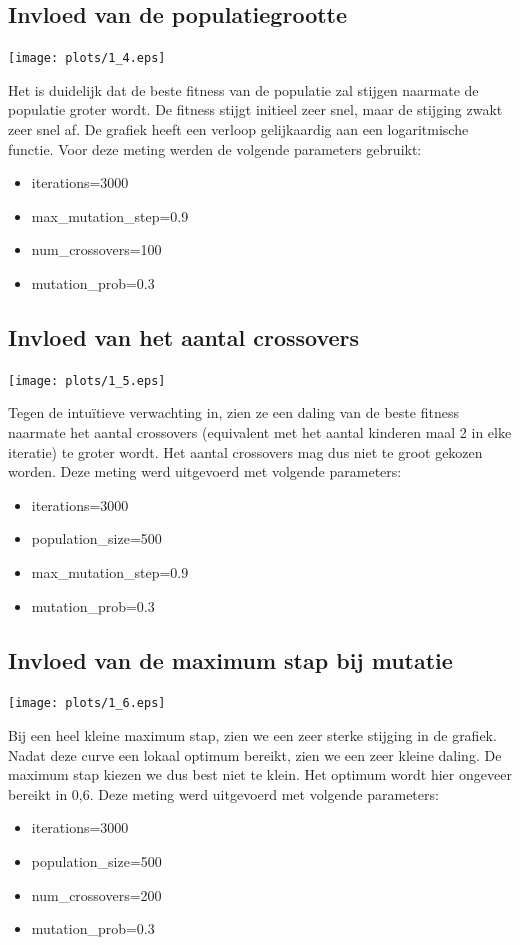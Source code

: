 \documentclass[]{article}
\begin{document}
\subsection{Invloed van de populatiegrootte}
\begin{center}\texttt{[image: plots/1\_4.eps]}\end{center}
Het is duidelijk dat de beste fitness van de populatie zal stijgen naarmate de populatie groter wordt. De fitness stijgt initieel zeer snel, maar de stijging zwakt zeer snel af.
De grafiek heeft een verloop gelijkaardig aan een logaritmische functie.
Voor deze meting werden de volgende parameters gebruikt:
\begin{itemize}
\item iterations=3000
\item max\_mutation\_step=0.9
\item num\_crossovers=100
\item mutation\_prob=0.3
\end{itemize}

\subsection{Invloed van het aantal crossovers}
\begin{center}\texttt{[image: plots/1\_5.eps]}\end{center}
Tegen de intu\"itieve verwachting in, zien ze een daling van de beste fitness naarmate het aantal crossovers (equivalent met het aantal kinderen maal 2 in elke iteratie) te groter wordt.
Het aantal crossovers mag dus niet te groot gekozen worden.
Deze meting werd uitgevoerd met volgende parameters:
\begin{itemize}
\item iterations=3000
\item population\_size=500
\item max\_mutation\_step=0.9
\item mutation\_prob=0.3
\end{itemize}


\subsection{Invloed van de maximum stap bij mutatie}
\begin{center}\texttt{[image: plots/1\_6.eps]}\end{center}
Bij een heel kleine maximum stap, zien we een zeer sterke stijging in de grafiek. Nadat deze curve een lokaal optimum bereikt,
zien we een zeer kleine daling. De maximum stap kiezen we dus best niet te klein. Het optimum wordt hier ongeveer bereikt in 0,6.
Deze meting werd uitgevoerd met volgende parameters:
\begin{itemize}
\item iterations=3000
\item population\_size=500
\item num\_crossovers=200
\item mutation\_prob=0.3
\end{itemize}
\end{document}
